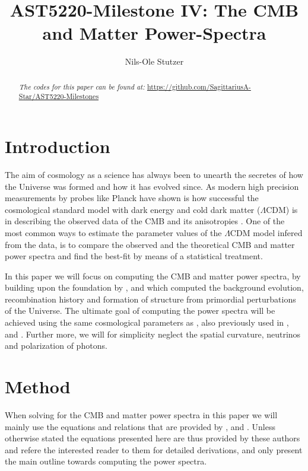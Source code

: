 \documentclass[twocolumn]{aastex62}
\begin{document}
\title{\Large AST5220-Milestone IV: The CMB and Matter Power-Spectra}

\author{Nils-Ole Stutzer}

\begin{abstract}
    
    \textit{The codes for this paper can be found at:} \newline \url{https://github.com/SagittariusA-Star/AST5220-Milestones}
\end{abstract}

\section{Introduction} \label{sec:Intro}
The aim of cosmology as a science has always been to unearth the secretes of how the Universe was formed and how it has evolved since. As modern high precision
measurements by probes like Planck have shown is how successful the cosmological standard model with dark energy and cold dark matter ($\Lambda$CDM) is in describing the observed data of the CMB and its anisotropies \citep[]{planckcollaboration:2018}. One of the most common ways to estimate the parameter values of the $\Lambda$CDM model infered from the data, is to compare the observed and the theoretical CMB and matter power spectra and find the best-fit by means of a statistical treatment. 

In this paper we will focus on computing the CMB and matter power spectra, by building upon the foundation by \cite{stutzer:2020a}, \cite{stutzer:2020b} and \cite{stutzer:2020c} which computed the background evolution, recombination history and formation of structure from primordial perturbations of the Universe. The ultimate goal of computing the power spectra will be achieved using the same cosmological parameters as \cite{callin:2006}, also previously used in \cite{stutzer:2020a}, \cite{stutzer:2020b} and \cite{stutzer:2020c}. Further more, we will for simplicity neglect the spatial curvature, neutrinos and polarization of photons. 


\section{Method} \label{sec:Method}
When solving for the CMB and matter power spectra in this paper we will mainly use the equations and relations that are provided by \cite{winther:2020c}, \cite{callin:2006} and \cite{dodelson:2003}. Unless otherwise stated the equations presented here are thus provided by these authors and refere the interested reader to them for detailed derivations, and only present the main outline towards computing the power spectra.  
\end{document}
